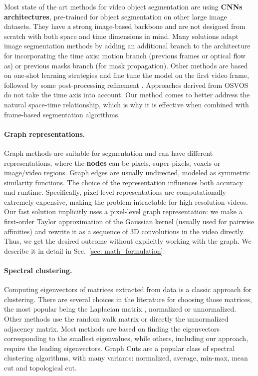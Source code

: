 \documentclass{article}
\begin{document}
Most state of the art methods for video object segmentation are using \textbf{CNNs architectures}, pre-trained for object segmentation on other large image datasets. They have a strong image-based backbone and are not designed from scratch with both space and time dimensions in mind. Many solutions \cite{masktrack} adapt image segmentation methods by adding an additional branch to the architecture for incorporating the time axis: motion branch (previous frames or optical flow as) or previous masks branch (for mask propagation). Other methods are based on one-shot learning strategies and fine tune the model on the first video frame, followed by some post-processing refinement \cite{osvoss}. Approaches derived from OSVOS~ do not take the time axis into account. Our method comes to better address the natural space-time relationship, which is why it is effective when combined with frame-based segmentation algorithms. 

\paragraph{Graph representations.} Graph methods are suitable for segmentation and can have different representations, where the \textbf{nodes} can be pixels, super-pixels, voxels or image/video regions. Graph edges are usually undirected, modeled as symmetric similarity functions.
The choice of the representation influences both accuracy and runtime. Specifically, pixel-level representations are computationally extremely expensive, making the problem intractable for high resolution videos. Our fast solution implicitly uses a pixel-level graph representation: we make
a first-order Taylor approximation of the Gaussian kernel (usually used for pairwise affinities) and rewrite it as a sequence of 3D convolutions in the video directly. Thus, we get the desired outcome without explicitly working with the graph. We describe it in detail in Sec.~\ref{sec: math_formulation}. 

\paragraph{Spectral clustering.} Computing eigenvectors of matrices extracted from data is a classic approach for clustering. There are several choices in the literature for choosing those matrices, the most popular being the Laplacian matrix \cite{NJW}, normalized \cite{img_normalized_cut_malik_2000} or unnormalized. Other methods use the random walk matrix or directly the unnormalized adjacency matrix. Most methods are based on finding the eigenvectors corresponding to the smallest eigenvalues, while others, including our approach, require the leading eigenvectors. Graph Cuts are a popular class of spectral clustering algorithms, with many variants: normalized, average, min-max, mean cut and topological cut. 
\end{document}
